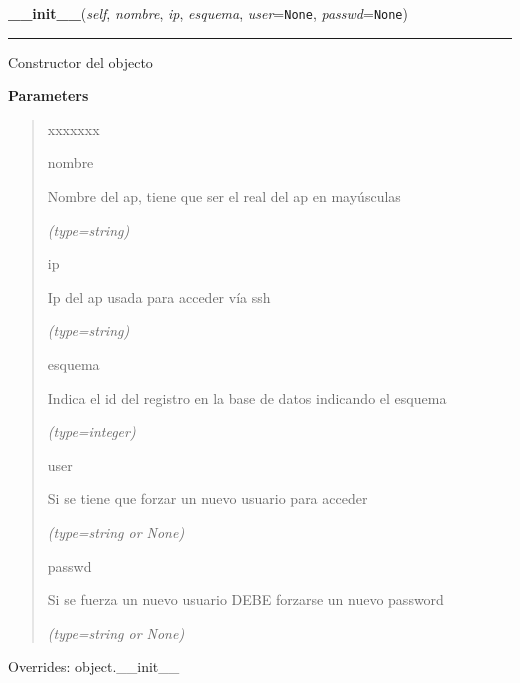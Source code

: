 \hspace{.8\funcindent}\begin{boxedminipage}{\funcwidth}

    \raggedright \textbf{\_\_init\_\_}(\textit{self}, \textit{nombre}, \textit{ip}, \textit{esquema}, \textit{user}={\tt None}, \textit{passwd}={\tt None})

    \vspace{-1.5ex}

    \rule{\textwidth}{0.5\fboxrule}
\setlength{\parskip}{2ex}
    Constructor del objecto

\setlength{\parskip}{1ex}
      \textbf{Parameters}
      \vspace{-1ex}

      \begin{quote}
        \begin{Ventry}{xxxxxxx}

          \item[nombre]

          Nombre del ap, tiene que ser el real del ap en mayúsculas

            {\it (type=string)}

          \item[ip]

          Ip del ap usada para acceder vía ssh

            {\it (type=string)}

          \item[esquema]

          Indica el id del registro en la base de datos indicando el 
          esquema

            {\it (type=integer)}

          \item[user]

          Si se tiene que forzar un nuevo usuario para acceder

            {\it (type=string or None)}

          \item[passwd]

          Si se fuerza un nuevo usuario DEBE forzarse un nuevo password

            {\it (type=string or None)}

        \end{Ventry}

      \end{quote}

      Overrides: object.\_\_init\_\_

    \end{boxedminipage}

